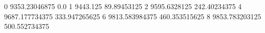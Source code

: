 0 9353.23046875 0.0
1 9443.125 89.89453125
2 9595.6328125 242.40234375
4 9687.177734375 333.947265625
6 9813.583984375 460.353515625
8 9853.783203125 500.552734375
